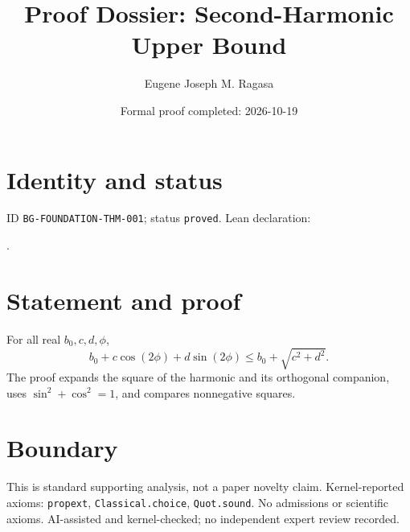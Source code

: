 \documentclass[11pt]{article}
\title{Proof Dossier: Second-Harmonic Upper Bound}\author{Eugene Joseph M. Ragasa}\date{Formal proof completed: 2026-10-19}
\begin{document}
\maketitle
\section{Identity and status}
ID \texttt{BG-FOUNDATION-THM-001}; status \texttt{proved}. Lean declaration:
\par{}.
\section{Statement and proof}
For all real $b_0,c,d,\phi$,
\[b_0+c\cos(2\phi)+d\sin(2\phi)\le b_0+\sqrt{c^2+d^2}.\]
The proof expands the square of the harmonic and its orthogonal companion, uses
$\sin^2+\cos^2=1$, and compares nonnegative squares.
\section{Boundary}
This is standard supporting analysis, not a paper novelty claim. Kernel-reported axioms:
\texttt{propext}, \texttt{Classical.choice}, \texttt{Quot.sound}. No admissions or
scientific axioms. AI-assisted and kernel-checked; no independent expert review recorded.
\end{document}
